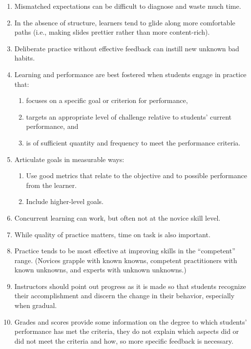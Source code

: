 \begin{enumerate}
\item
  Mismatched expectations can be difficult to diagnose and waste much
  time.
\item
  In the absence of structure, learners tend to glide along more
  comfortable paths (i.e., making slides prettier rather than more
  content-rich).
\item
  Deliberate practice without effective feedback can instill new unknown
  bad habits.
\item
  Learning and performance are best fostered when students engage in
  practice that:

  \begin{enumerate}
    \item
    focuses on a specific goal or criterion for performance,
  \item
    targets an appropriate level of challenge relative to students'
    current performance, and
  \item
    is of sufficient quantity and frequency to meet the performance
    criteria.
  \end{enumerate}
\item
  Articulate goals in measurable ways:

  \begin{enumerate}
    \item
    Use good metrics that relate to the objective and to possible
    performance from the learner.
  \item
    Include higher-level goals.
  \end{enumerate}
\item
  Concurrent learning can work, but often not at the novice skill level.
\item
  While quality of practice matters, time on task is also important.
\item
  Practice tends to be most effective at improving skills in the
  ``competent'' range. (Novices grapple with known knowns, competent
  practitioners with known unknowns, and experts with unknown unknowns.)
\item
  Instructors should point out progress as it is made so that students
  recognize their accomplishment and discern the change in their
  behavior, especially when gradual.
\item
  Grades and scores provide some information on the degree to which
  students' performance has met the criteria, they do not explain which
  aspects did or did not meet the criteria and how, so more specific
  feedback is necessary.
\end{enumerate}

